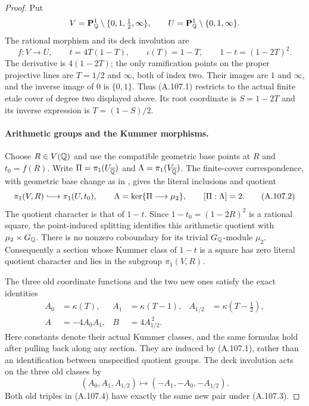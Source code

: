 \begin{proof}
Put
\[
 V=\mathbf P^1_\mathbb Q\setminus\{0,1,\tfrac12,\infty\},
 \qquad U=\mathbf P^1_\mathbb Q\setminus\{0,1,\infty\}.
\]
The rational morphism and its deck involution are
\[
 f:V\longrightarrow U,\qquad t=4T(1-T),
 \qquad \iota(T)=1-T,\qquad
                   1-t=(1-2T)^2.
 \tag{A.107.1}
\]
The derivative is $4(1-2T)$; the only ramification points
on the proper projective lines are $T=1/2$ and $\infty$,
both of index two.
Their images are $1$ and $\infty$, and the inverse image
of $0$ is $\{0,1\}$.
Thus (A.107.1) restricts to the actual finite etale cover of
degree two displayed above.
Its root coordinate is $S=1-2T$ and its inverse expression
is $T=(1-S)/2$.

\paragraph{Arithmetic groups and the Kummer morphisms.}
Choose $R\in V(\mathbb Q)$ and use the compatible geometric
base points at $R$ and $t_0=f(R)$.
Write $\Pi=\pi_1(U_{\overline{\mathbb Q}})$ and
$\Lambda=\pi_1(V_{\overline{\mathbb Q}})$.
The finite-cover correspondence, with geometric base change
as in \cite[Expos\'e IX, Th\'eor\`eme 6.1]{AgentSGA1},
gives the literal inclusions and quotient
\[
 \pi_1(V,R)\lhook\joinrel\longrightarrow\pi_1(U,t_0),
 \qquad
 \Lambda=\ker\{\Pi\longrightarrow\mu_2\},
 \qquad [\Pi:\Lambda]=2.
 \tag{A.107.2}
\]
The quotient character is that of $1-t$.
Since $1-t_0=(1-2R)^2$ is a rational square, the
point-induced splitting identifies this arithmetic
quotient with $\mu_2\times G_\mathbb Q$.
There is no nonzero coboundary for its trivial
$G_\mathbb Q$-module $\mu_2$.
Consequently a section whose Kummer class of $1-t$ is
a square has zero literal quotient character and lies
in the subgroup $\pi_1(V,R)$.

The three old coordinate functions and the two new
ones satisfy the exact identities
\[
 \begin{aligned}
 A_0&=\kappa(T),&
 A_1&=\kappa(T-1),&
 A_{1/2}&=\kappa(T-\tfrac12),\\
 A&=-4A_0A_1,&
 B&=4A_{1/2}^{\,2}.
 \end{aligned}
 \tag{A.107.3}
\]
Here constants denote their actual Kummer classes, and
the same formulas hold after pulling back along any
section.  They are induced by (A.107.1), rather than an
identification between unspecified quotient groups.
The deck involution acts on the three old classes by
\[
               (A_0,A_1,A_{1/2})
                    \longmapsto(-A_1,-A_0,-A_{1/2}).
 \tag{A.107.4}
\]
Both old triples in (A.107.4) have exactly the same new
pair under (A.107.3).


\end{proof}

